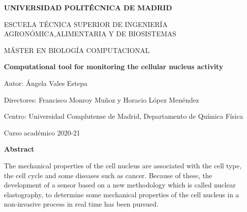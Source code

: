 \documentclass[12pt, a4paper]{article} %
\begin{document}
	
	\setlength{\parindent}{8pt}
	
	\pagestyle{empty}
	
	
	\begin{titlepage}
		
		{} %
		\vspace{1cm}
		
		\centering
		{ \bfseries \Large UNIVERSIDAD POLITÉCNICA DE MADRID}
		\vspace{1.50cm}
		
		{ \large ESCUELA TÉCNICA SUPERIOR DE INGENIERÍA AGRONÓMICA,ALIMENTARIA Y DE BIOSISTEMAS }
		\vspace{1.50cm}
		
		{ \Large MÁSTER EN BIOLOGÍA COMPUTACIONAL}
		\vspace{1.50cm}
		
		{\bfseries \Large Computational tool for monitoring the cellular nucleus activity}\vspace{1.50cm}
		
		{\Large Autor: Ángela Vales Estepa}\vspace{2mm} 
		
		{\Large Directores: Francisco Monroy Muñoz y Horacio López Menéndez}\vspace{2mm}
		
		{\Large Centro: Universidad Complutense de Madrid, Departamento de Química Física}\vspace{20mm}
		
		{\large Curso acad\'emico 2020-21}\vspace{1mm} 
		
	\end{titlepage}
	\newpage
	
	
	{\bfseries \Large Abstract }\vspace{5mm} 
	
	The mechanical properties of the cell nucleus are associated with the cell type, the cell cycle and some diseases such as cancer. Because of these, the development of a sensor based on a new methodology which is called nuclear elastography, to determine some mechanical properties of the cell nucleus in a non-invasive process in real time has been pursued.
	
\end{document}
